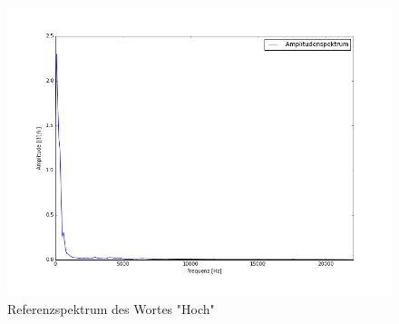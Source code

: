\documentclass[12pt,oneside,a4paper]{report}
\begin{document}
\begin{figure}[H]
\centering\small
\includegraphics[scale=0.5]{src/ReferenzspektrumHoch.png}
\caption{Referenzspektrum des Wortes "Hoch"}
\label{fig:REF_HOCH}
\end{figure}
\end{document}
